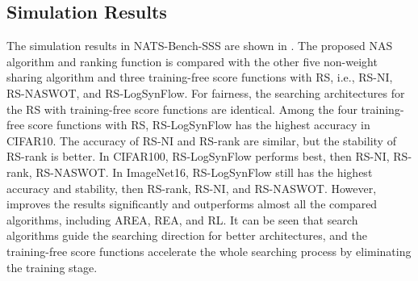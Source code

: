 \documentclass[sigconf]{acmart}
\begin{document}
    \subsection{Simulation Results}
    The simulation results in NATS-Bench-SSS \cite{Dong_2021} are shown in . 
    The proposed NAS algorithm and ranking function is compared with the other five non-weight sharing 
    algorithm and three training-free score functions with RS, i.e., RS-NI, RS-NASWOT, and 
    RS-LogSynFlow. For fairness, the searching architectures for the RS with training-free 
    score functions are identical. Among the four training-free score functions with RS, RS-LogSynFlow 
    has the highest accuracy in CIFAR10. The accuracy of RS-NI and RS-rank are similar, but the stability 
    of RS-rank is better. In CIFAR100, RS-LogSynFlow performs best, then RS-NI, RS-rank, RS-NASWOT. 
    In ImageNet16, RS-LogSynFlow still has the highest accuracy and stability, then RS-rank, RS-NI, 
    and RS-NASWOT. However, \palg{} improves the results significantly and outperforms almost all the 
    compared algorithms, including AREA, REA, and RL. It can be seen that search algorithms guide 
    the searching direction for better architectures, and the training-free score functions
    accelerate the whole searching process by eliminating the training stage. 
\end{document}
